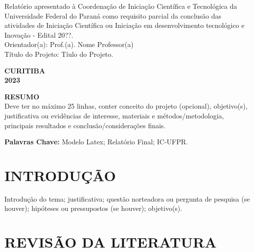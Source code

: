 \documentclass[a4paper, 12pt]{article}
\begin{document}
\begin{bfseries}
\begin{center}
\begin{minipage}[t]{0.45\textwidth} \hspace{2cm}
\raggedright

\end{minipage}
\begin{minipage}[t]{0.5\textwidth}\hspace{2cm}
\raggedright

\begin{flushleft}
\footnotesize  
\justify
\hspace{-0,35cm}
\textnormal{
Relatório apresentado à Coordenação de Iniciação Científica e Tecnológica da Universidade Federal do Paraná como requisito parcial da conclusão das atividades de Iniciação Científica ou Iniciação em desenvolvimento tecnológico e Inovação - Edital 20??.\\
Orientador(a): Prof.(a).  Nome Professor(a)\\
Título do Projeto: Tíulo do Projeto.
}
\end{flushleft}
    
\end{minipage}

\vspace*{3cm}
\textbf{\MakeUppercase{CURITIBA}} \\
\textbf{\MakeUppercase{\textnormal{2023}}}
\end{center}

\end{bfseries}
\newpage

\hspace{-1,1cm}
\textbf{\MakeUppercase{RESUMO}} \\ 
Deve ter no máximo 25 linhas, conter conceito do projeto (opcional), objetivo(s), justificativa ou evidências de interesse, materiais e métodos/metodologia, principais resultados e conclusão/considerações finais.

\vspace{1cm}
\hspace{-1cm}
\textbf{Palavras Chave:} Modelo Latex; Relatório Final; IC-UFPR.


\section{INTRODUÇÃO} 

Introdução do tema; justificativa; questão norteadora ou pergunta de pesquisa (se houver); hipóteses ou pressupostos (se houver); objetivo(s).


\section{REVISÃO DA LITERATURA}
\end{document}
